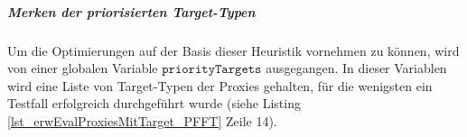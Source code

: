 \documentclass[a4paper,12pt]{article}
\begin{document}

\subparagraph{Merken der priorisierten Target-Typen}
\noindent
\newline
Um die Optimierungen auf der Basis dieser Heuristik vornehmen zu können, wird von einer globalen Variable $\texttt{priorityTargets}$ ausgegangen. In dieser Variablen wird eine Liste von Target-Typen der Proxies gehalten, für die wenigsten ein Testfall erfolgreich durchgeführt wurde (siehe Listing \ref{lst_erwEvalProxiesMitTarget_PFFT} Zeile 14).
\end{document}
